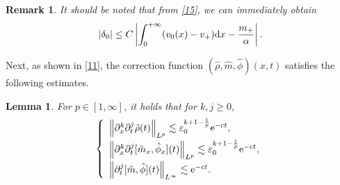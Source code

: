 \documentclass[11pt]{article}
\theoremstyle{plain}
\newtheorem{lemma}{Lemma}[section]
\newtheorem{remark}{Remark}[section]
\numberwithin{equation}{section}
\begin{document}
\begin{remark}
	 It should be noted that from \eqref{15}, we can immediately obtain
	 \begin{equation}\label{3.25a}
	|\delta_0|\leq C\left|\int_{0}^{+\infty} (v_0(x) - v_+){\rm d}x - \frac{m_+}{\alpha}\right|. 	
	 \end{equation}
\end{remark}


Next, as shown in \eqref{11}, the correction function  $(\hat{\rho},\hat{m},\hat\phi)(x,t)$ satisfies the following estimates.
\begin{lemma}\label{l3.2}
 For $p \in [1, \infty]$, it holds that for $k, j \geq 0$,
 \begin{equation}\label{3.25}
 \left\{\begin{array}{l}
    \left\|\partial_{x}^{k} \partial_{t}^{j} \hat{\rho}(t)\right\|_{L^{p}}\lesssim\varepsilon_{0}^{k+1-\frac{1}{p}} {\rm e}^{-ct}, \\[2mm]
    \left\|\partial_{x}^{k} \partial_{t}^{j} [\hat{m}_x,\hat{\phi}_x](t)\right\|_{L^{p}}\lesssim\varepsilon_{0}^{k+1-\frac{1}{p}}{\rm e}^{-ct}, \\[2mm]
    \left\|\partial_{t}^{j}[\hat{m},\hat{\phi}](t)\right\|_{L^{\infty}}\lesssim{\rm e}^{-ct}.
\end{array}\right.
\end{equation}
\end{lemma}
\end{document}
